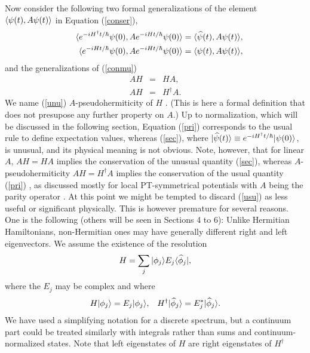 %
%
%
%
Now consider the following two formal generalizations of the element $\langle \psi(t),A\psi(t)\rangle$ in Equation (\ref{conser}),
%
\begin{eqnarray}
&&\la e^{-iH^\dagger t/\hbar} \psi(0), A e^{-iHt/\hbar} \psi(0)\ra=\la \widehat{\psi}(t),A\psi(t)\ra,
\label{sec}
\\
%
&&\la e^{-iH t/\hbar}  \psi(0), A e^{-iHt/\hbar} \psi(0)\ra=\la \psi(t), A \psi(t)\ra,
\label{pri}
\end{eqnarray}
%
and the  generalizations of (\ref{conmu})
%
\begin{eqnarray}
AH&=&HA,
\label{usu}
\\
AH&=&H^\dagger A.
\label{unu}
\end{eqnarray}
%
We name (\ref{unu}) $A$-pseudohermiticity of $H$ \cite{Mostafazadeh2010}.
(This is here a formal definition that does not presupose any  further property
on $A$.)
Up  to normalization, which will be discussed in the following section, Equation (\ref{pri}) corresponds to the
usual rule to
define expectation values, whereas (\ref{sec}), where $|\widehat{\psi}(t)\rangle\equiv e^{-iH^\dagger t/\hbar} |\psi(0)\rangle$,
is unusual, and its physical meaning is not obvious. Note, however, that for linear $A$,
$AH=HA$ implies the conservation of the unusual quantity (\ref{sec}), whereas
$A$-pseudohermiticity $AH=H^\dagger A$ implies the conservation of the usual quantity (\ref{pri}) \cite{Mostafazadeh2002,Vitanov2016},
as discussed mostly for local PT-symmetrical potentials with $A$ being the parity operator \cite{Bagchi2001,Zezyulin2013,Konotop2016}.
At this point we might be tempted to discard (\ref{usu}) as less useful or significant physically.
This is however premature for several reasons. One is the following (others will be seen in Sections 4 to 6):
Unlike Hermitian Hamiltonians, non-Hermitian ones may have generally different
right and left eigenvectors. We assume the existence of the resolution
%
\begin{equation}
H=\sum_j |\phi_j\ra E_j \la\widehat{\phi}_j|,
\label{res}
\end{equation}
%
where the $E_j$ may be complex and where
%
\begin{eqnarray}
H|\phi_j\rangle=E_j|\phi_j\rangle, \;\;\;
H^\dagger|\widehat{\phi}_j\rangle=E_j^* |\widehat{\phi}_j\rangle.
\end{eqnarray}
%
We have used a simplifying notation for  a discrete spectrum, but a continuum
part could be treated similarly with integrals rather than sums and continuum-normalized states.
Note that left eigenstates of $H$ are right eigenstates of $H^\dagger$
